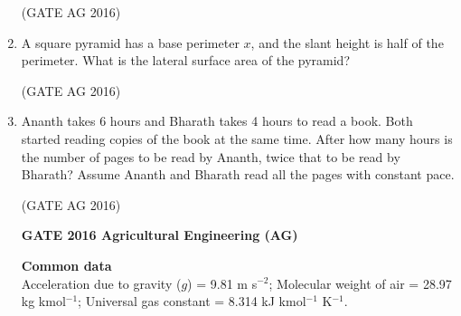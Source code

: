 \documentclass[journal]{IEEEtran}
\begin{document}
\begin{enumerate}
\begin{enumerate}
\end{enumerate}
\hfill(GATE AG 2016)\\

\medskip

\item 
A square pyramid has a base perimeter $x$, and the slant height is half of the perimeter. What is the lateral surface area of the pyramid?

\begin{enumerate}
\end{enumerate}
\hfill(GATE AG 2016)\\

\medskip

\item 
Ananth takes 6 hours and Bharath takes 4 hours to read a book. Both started reading copies of the book at the same time. After how many hours is the number of pages to be read by Ananth, twice that to be read by Bharath? Assume Ananth and Bharath read all the pages with constant pace.

\begin{enumerate}
\end{enumerate}
\hfill(GATE AG 2016)\\

\medskip

\noindent
\textbf{GATE 2016 Agricultural Engineering (AG)}

\noindent
\textbf{Common data}\\
Acceleration due to gravity ($g$) = 9.81 m s$^{-2}$; Molecular weight of air = 28.97 kg kmol$^{-1}$; Universal gas constant = 8.314 kJ kmol$^{-1}$ K$^{-1}$.


\end{enumerate}
\end{document}
